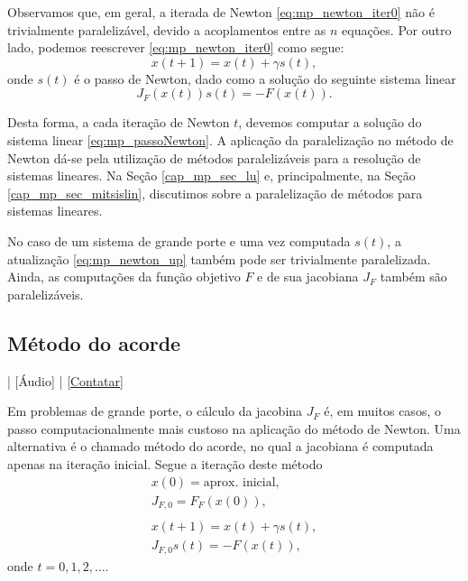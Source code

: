 Observamos que, em geral, a iterada de Newton \eqref{eq:mp_newton_iter0} não é trivialmente paralelizável, devido a acoplamentos entre as $n$ equações. Por outro lado, podemos reescrever \eqref{eq:mp_newton_iter0} como segue:
\begin{equation}\label{eq:mp_newton_up}
  x(t+1) = x(t) + \gamma s(t),
\end{equation}
onde $s(t)$ é o passo de Newton, dado como a solução do seguinte sistema linear
\begin{equation}\label{eq:mp_passoNewton}
  J_F\left(x(t)\right)s(t) = -F\left(x(t)\right).
\end{equation}

Desta forma, a cada iteração de Newton $t$, devemos computar a solução do sistema linear \eqref{eq:mp_passoNewton}. A aplicação da paralelização no método de Newton dá-se pela utilização de métodos paralelizáveis para a resolução de sistemas lineares. Na Seção \ref{cap_mp_sec_lu} e, principalmente, na Seção \ref{cap_mp_sec_mitsislin}, discutimos sobre a paralelização de métodos para sistemas lineares.

No caso de um sistema de grande porte e uma vez computada $s(t)$, a atualização \eqref{eq:mp_newton_up} também pode ser trivialmente paralelizada. Ainda, as computações da função objetivo $F$ e de sua jacobiana $J_F$ também são paralelizáveis.

\subsection{Método do acorde}

\begin{flushright}
  [Vídeo] | [Áudio] | \href{https://phkonzen.github.io/notas/contato.html}{[Contatar]}
\end{flushright}

Em problemas de grande porte, o cálculo da jacobina $J_F$ é, em muitos casos, o passo computacionalmente mais custoso na aplicação do método de Newton. Uma alternativa é o chamado método do acorde, no qual a jacobiana é computada apenas na iteração inicial. Segue a iteração deste método
\begin{gather}
  x(0) = \text{aprox. inicial},\\
  J_{F,0} = F_F\left(x(0)\right),\label{eq:mp_acorde_jac}\\
  ~\nonumber\\
  x(t+1) = x(t) + \gamma s(t),\label{eq:mp_acorde_up}\\
  J_{F,0}s(t) = -F(x(t)),\label{eq:mp_acorde_dir}
\end{gather}
onde $t=0, 1, 2, \ldots$.

